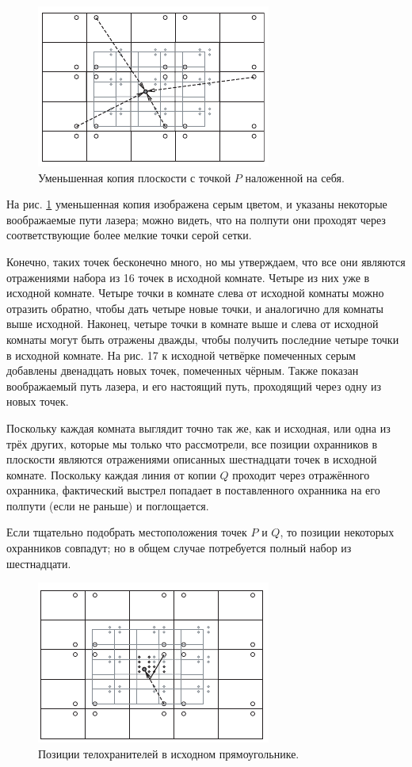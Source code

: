 \begin{figure}[t!]
\centering
\includegraphics[scale=1]{pics/room2}
\caption{Уменьшенная копия плоскости с точкой $P$ наложенной на себя.}
\label{pic:room2}
\end{figure}

На рис. \ref{pic:room2} уменьшенная копия изображена серым цветом, и указаны некоторые воображаемые пути лазера; можно видеть, что на полпути они проходят через соответствующие более мелкие точки серой сетки.

Конечно, таких точек бесконечно много, но мы утверждаем, что все они являются отражениями набора из 16 точек в исходной комнате.
Четыре из них уже в исходной комнате.
Четыре точки в комнате слева от исходной комнаты можно отразить обратно, чтобы дать четыре новые точки, и аналогично для комнаты выше исходной.
Наконец, четыре точки в комнате выше и слева от исходной комнаты могут быть отражены дважды, чтобы получить последние четыре точки в исходной комнате.
На рис. 17 к исходной четвёрке помеченных серым добавлены двенадцать новых точек, помеченных чёрным.
Также показан воображаемый путь лазера, и его настоящий путь, проходящий через одну из новых точек.

Поскольку каждая комната выглядит точно так же, как и исходная, или одна из трёх других, которые мы только что рассмотрели, все позиции охранников в плоскости являются отражениями описанных шестнадцати точек в исходной комнате.
Поскольку каждая линия от копии $Q$ проходит через отражённого охранника, фактический выстрел попадает в поставленного охранника на его полпути (если не раньше) и поглощается.

Если тщательно подобрать местоположения точек $P$ и $Q$, то позиции некоторых охранников совпадут;
но в общем случае потребуется полный набор из шестнадцати.

\begin{figure}[h!]
\centering
\includegraphics[scale=1]{pics/room3}
\caption{Позиции телохранителей в исходном прямоугольнике.}
\label{pic:room3}
\end{figure}

